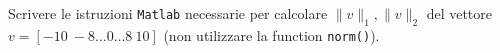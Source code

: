 Scrivere le istruzioni {\tt Matlab} necessarie per calcolare $\|v\|_1, \|v\|_2$ del vettore $v = [-10 \ -8 \ldots 0 \ldots 8 \ 10]$ (non utilizzare la function {\tt norm()}). 


